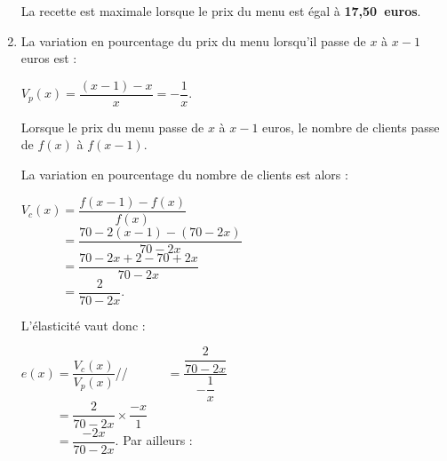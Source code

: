 \begin{corrige}
\begin{enumerate}
          La recette est maximale lorsque le prix du menu est égal à \textbf{17,50~euros}.
          \item %
          La variation en pourcentage du prix du menu lorsqu'il passe de $x$ à $x-1$ euros est :
          \par
          $V_p(x)=\dfrac{(x-1)-x}{x}=-\dfrac{1}{x}$.
          \par
          Lorsque le prix du menu passe de $x$ à $x-1$ euros, le nombre de clients passe de $f(x)$ à $f(x-1)$.
          \par
          La variation en pourcentage du nombre de clients est alors :
          \par
          $V_c(x)=\dfrac{f(x-1)-f(x)}{f(x)}$\\
          $\phantom{V_c(x)}=\dfrac{70-2(x-1)-(70-2x)}{70-2x}$\\
          $\phantom{V_c(x)}=\dfrac{70-2x+2-70+2x}{70-2x}$\\
          $\phantom{V_c(x)}=\dfrac{2}{70-2x}.$
          \par
          L'élasticité vaut donc :
          \par
          $e(x)=\dfrac{V_c(x)}{V_p(x)}$//
          $\phantom{e(x)}=\dfrac{\dfrac{2}{70-2x}}{-\dfrac{1}{x}}$\\
          $\phantom{e(x)}=\dfrac{2}{70-2x} \times \dfrac{-x}{1}$\\
          $\phantom{e(x)}=\dfrac{-2x}{70-2x}.$
\medskip
          Par ailleurs :
          \par

\end{enumerate}
\end{corrige}
